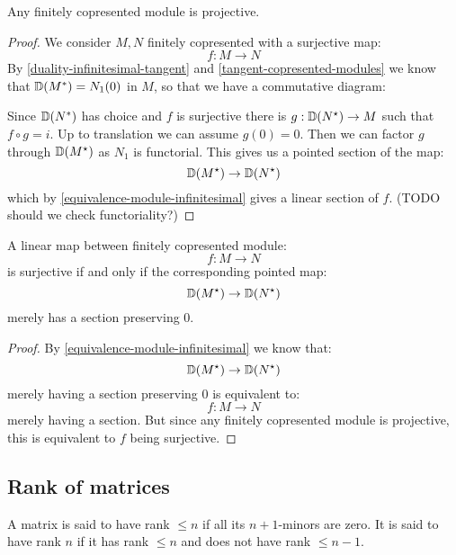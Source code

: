 \begin{lemma}
Any finitely copresented module is projective.
\end{lemma}

\begin{proof}
We consider $M,N$ finitely copresented with a surjective map:
\[f:M\to N\]
By \cref{duality-infinitesimal-tangent} and \cref{tangent-copresented-modules} we know that $\mathbb{D}(M^*) = N_1(0)$ in $M$, so that we have a commutative diagram:
\begin{center}
\end{center}
Since $\mathbb{D}(N^*)$ has choice and $f$ is surjective there is $g:\mathbb{D}(N^\star)\to M$ such that $f\circ g = i$. Up to translation we can assume $g(0) = 0$.
Then we can factor $g$ through $\mathbb{D}(M^\star)$ as $N_1$ is functorial. This gives us a pointed section of the map:
\[\mathbb{D}(M^\star) \to \mathbb{D}(N^\star)\]
which by \cref{equivalence-module-infinitesimal} gives a linear section of $f$. (TODO should we check functoriality?)
\end{proof}

\begin{lemma}\label{neighborhood-tangent-correspondence-smooth}
A linear map between finitely copresented module:
\[f:M\to N\]
is surjective if and only if the corresponding pointed map:
\[\mathbb{D}(M^\star) \to \mathbb{D}(N^\star)\]
merely has a section preserving $0$.
\end{lemma}

\begin{proof}
By \cref{equivalence-module-infinitesimal} we know that:
\[\mathbb{D}(M^\star) \to \mathbb{D}(N^\star)\]
merely having a section preserving $0$ is equivalent to:
\[f:M\to N\]
merely having a section. But since any finitely copresented module is projective, this is equivalent to $f$ being surjective.
\end{proof}


\subsection{Rank of matrices}

\begin{definition}
A matrix is said to have rank $\leq n$ if all its $n+1$-minors are zero. It is said to have rank $n$ if it has rank $\leq n$ and does not have rank $\leq n-1$.
\end{definition}

